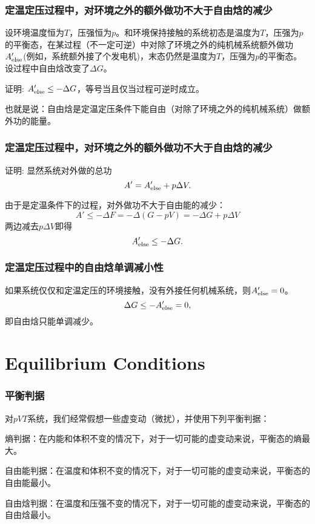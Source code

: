 \documentclass[CJK,14pt]{beamer}
\begin{document}
\begin{frame}
\frametitle{定温定压过程中，对环境之外的额外做功不大于自由焓的减少}

  设环境温度恒为$T$，压强恒为$p$。和环境保持接触的系统初态是温度为$T$，压强为$p$的平衡态，在某过程（不一定可逆）中对除了环境之外的纯机械系统{\blue 额外做功$A'_{\rm else}$}(例如，系统额外接了个发电机)，末态仍然是温度为$T$，压强为$p$的平衡态。设过程中自由焓改变了$\Delta G$。

  证明: $A'_{\rm else}  \le -\Delta G$，等号当且仅当过程可逆时成立。


   也就是说：{\blue 自由焓是定温定压条件下能自由（对除了环境之外的纯机械系统）做额外功的能量。}
  
\end{frame}


\begin{frame}
\frametitle{定温定压过程中，对环境之外的额外做功不大于自由焓的减少}

证明: 显然系统对外做的总功 $$ A' = A'_{\rm else} + p \Delta V.$$

由于是定温条件下的过程，对外做功不大于自由能的减少：
$$ A' \le - \Delta F = -\Delta (G- pV) = - \Delta G + p \Delta V$$
两边减去$p\Delta V$即得
$$A'_{\rm else}  \le -\Delta G.$$

\end{frame}




\begin{frame}
\frametitle{定温定压过程中的自由焓单调减小性}
如果系统仅仅和定温定压的环境接触，没有外接任何机械系统，则$A'_{\rm else}=0$。
$$\Delta G \le - A'_{\rm else} = 0 ,$$
即自由焓只能单调减少。

\end{frame}


\section{Equilibrium Conditions}


\begin{frame}
\frametitle{平衡判据}

对$pVT$系统，我们经常假想一些虚变动（微扰），并使用下列平衡判据：
\bitem
\item{熵判据：在内能和体积不变的情况下，对于一切可能的虚变动来说，平衡态的熵最大。}
\item{自由能判据：在温度和体积不变的情况下，对于一切可能的虚变动来说，平衡态的自由能最小。}
\item{自由焓判据：在温度和压强不变的情况下，对于一切可能的虚变动来说，平衡态的自由焓最小。}
\eitem
\end{frame}
\end{document}
